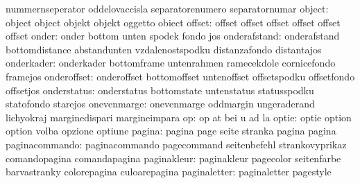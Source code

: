                            nummernseperator          oddelovaccisla
                           separatorenumero          separatornumar
                   object: object                    object
                           objekt                    objekt
                           oggetto                   obiect
                   offset: offset                    offset
                           offset                    offset
                           offset                    offset
                    onder: onder                     bottom
                           unten                     spodek
                           fondo                     jos
             onderafstand: onderafstand              bottomdistance
                           abstandunten              vzdalenostspodku
                           distanzafondo             distantajos
               onderkader: onderkader                bottomframe
                           untenrahmen               ramecekdole
                           cornicefondo              framejos
              onderoffset: onderoffset               bottomoffset
                           untenoffset               offsetspodku
                           offsetfondo               offsetjos
              onderstatus: onderstatus               bottomstate
                           untenstatus               statusspodku
                           statofondo                starejos
              onevenmarge: onevenmarge               oddmargin
                           ungeraderand              lichyokraj
                           marginedispari            margineimpara
                       op: op                        at
                           bei                       u
                           ad                        la
                    optie: optie                     option
                           option                    volba
                           opzione                   optiune
                   pagina: pagina                    page
                           seite                     stranka
                           pagina                    pagina
           paginacommando: paginacommando            pagecommand
                           seitenbefehl              strankovyprikaz
                           comandopagina             comandapagina
              paginakleur: paginakleur               pagecolor
                           seitenfarbe               barvastranky
                           colorepagina              culoarepagina
             paginaletter: paginaletter              pagestyle
